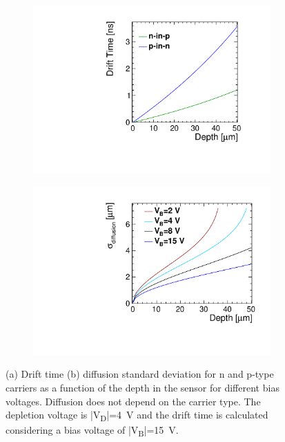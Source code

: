 \begin{figure}[htbp]
  \centering
  \begin{subfigure}[b]{0.45\textwidth}
    \includegraphics[width=\textwidth]{figures/ChargeSharing/DriftTime_n_vs_p_carrier.pdf}
    \caption{}\label{fig:Drift_n_vs_p}
  \end{subfigure}\hfill
  \begin{subfigure}[b]{0.45\textwidth}
    \includegraphics[width=\textwidth]{figures/ChargeSharing/Diffusion_vs_Bias.pdf}
    \caption{}\label{fig:Diffusion_n_vs_p}
  \end{subfigure}
  \caption{(a) Drift time (b) diffusion standard deviation for n and
    p-type carriers as a function of the depth in the sensor for
    different bias voltages. Diffusion does not depend on the carrier
    type. The depletion voltage is |V\textsubscript{D}|=4~V and the
    drift time is calculated considering a bias voltage of
    |V\textsubscript{B}|=15~V.}
\end{figure}

